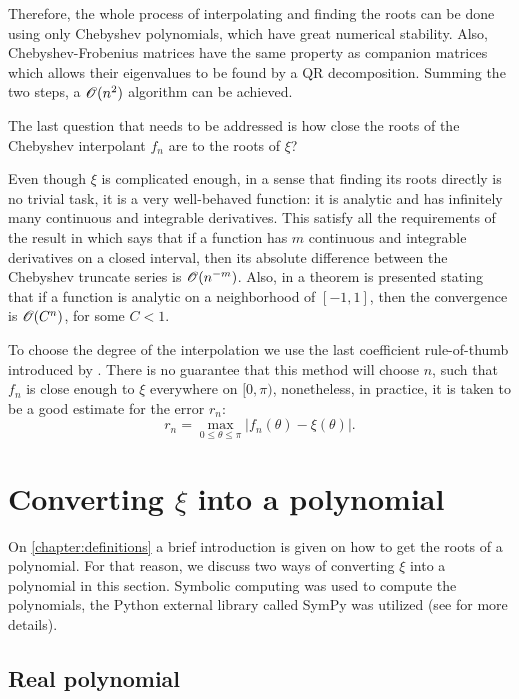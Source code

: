 Therefore, the whole process of interpolating and finding the roots can be done using only Chebyshev polynomials, which have great numerical stability. Also, Chebyshev-Frobenius matrices have the same property as companion matrices which allows their eigenvalues to be found by a QR decomposition. Summing the two steps, a $\mathscr{O}(n^2)$ algorithm can be achieved.

The last question that needs to be addressed is how close the roots of the Chebyshev interpolant $f_n$ are to the roots of $\xi$?

Even though $\xi$ is complicated enough, in a sense that finding its roots directly is no trivial task, it is a very well-behaved function: it is analytic and  has infinitely many continuous and integrable derivatives. This satisfy all the requirements of the result in  which says that if a function has $m$ continuous and integrable derivatives on a closed interval, then its absolute difference between the Chebyshev truncate series is $\mathscr{O}(n^{-m})$. Also, in  a theorem is presented stating that if a function is analytic on a neighborhood of $[-1, 1]$, then the convergence is $\mathscr{O}(C^n)$, for some $C<1$.

To choose the degree of the interpolation we use the last coefficient rule-of-thumb introduced by . There is no guarantee that this method will choose $n$, such that $f_n$ is close enough to $\xi$ everywhere on $[0, \pi)$, nonetheless, in practice, it is taken to be a good estimate for the error $r_n$:
\begin{equation}
r_n = \max_{0 \le \theta \le \pi} |f_n(\theta) - \xi(\theta)|.
\end{equation}


\section{Converting $\xi$ into a polynomial}

On \autoref{chapter:definitions} a brief introduction is given on how to get the roots of a polynomial. For that reason, we discuss two ways of converting $\xi$ into a polynomial in this section. Symbolic computing was used to compute the polynomials, the Python external library called SymPy was utilized (see  for more details).

\subsection{Real polynomial}

